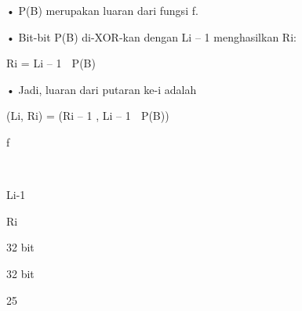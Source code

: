 \documentclass{article}
\begin{document}

• P(B) merupakan luaran dari fungsi f. 

• Bit-bit P(B) di-XOR-kan dengan Li – 1 menghasilkan Ri:

           Ri = Li – 1  P(B)

• Jadi, luaran dari putaran ke-i adalah


(Li, Ri) = (Ri – 1 , Li – 1  P(B)) 

f



Li-1

Ri

32 bit

32 bit

25
\end{document}
